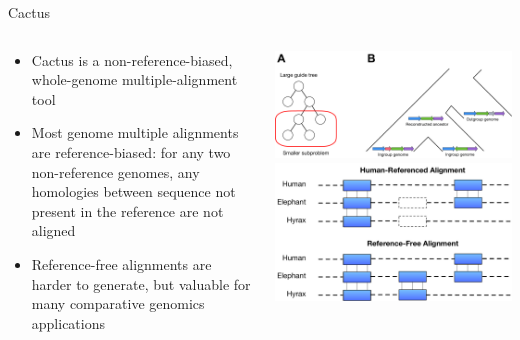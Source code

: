 \documentclass[10pt]{beamer}
\begin{document}
\begin{frame}{Cactus}
  \begin{columns}
    \begin{column}{0.5\textwidth}
      \begin{itemize}
          \item Cactus is a non-reference-biased, whole-genome multiple-alignment tool
          \item Most genome multiple alignments are reference-biased: for any two non-reference genomes, any homologies between sequence not present in the reference are not aligned
          \item Reference-free alignments are harder to generate, but valuable for many comparative genomics applications
      \end{itemize}
    \end{column}
    \begin{column}{0.5\textwidth}
      \includegraphics[width=\columnwidth]{images/progressive-alignment-and-reconstruction.pdf} \\
      \includegraphics[width=\columnwidth]{images/reference-free-diagram.pdf}
    \end{column}
  \end{columns}
\end{frame}
\end{document}
